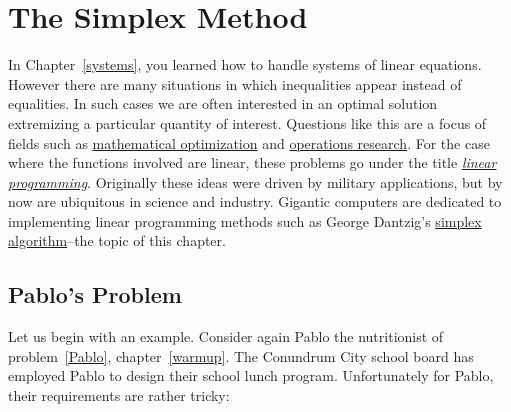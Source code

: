 \chapter{The Simplex Method}

In Chapter~\ref{systems}, you learned how to handle systems of linear equations.
However there are many situations in which inequalities appear instead of equalities. 
In such cases we are often interested 
in an optimal solution extremizing a particular quantity of interest. 
Questions like this
are a focus of fields such as 
\href{http://en.wikipedia.org/wiki/Mathematical_optimization}{mathematical optimization}
 and 
 \href{ http://en.wikipedia.org/wiki/Operations_research}{operations research}.
For the case where the functions involved are linear,  these problems go under the
title  
\href{http://en.wikipedia.org/wiki/Linear_programming}{
{{\itshape linear programming}}}. Originally these ideas were driven by military applications,
but by now are ubiquitous in science and industry. Gigantic computers are dedicated to implementing linear programming methods such as
George Dantzig's 
\href{http://en.wikipedia.org/wiki/Simplex_algorithm}{simplex algorithm}--the topic of this chapter.

\section{Pablo's Problem}

Let us begin with an example. Consider again Pablo the nutritionist of problem~\ref{Pablo}, chapter~\ref{warmup}.
The Conundrum City school board has employed Pablo to design their school lunch program. Unfortunately for Pablo, 
their requirements are rather tricky:

